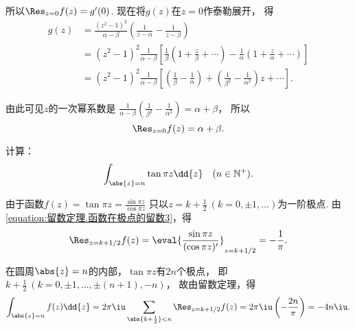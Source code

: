 \begin{example}
\begin{solution}
所以\(\Res_{z=0} f(z) = g'(0)\).
现在将\(g(z)\)在\(z=0\)作泰勒展开，
得\begin{align*}
	g(z) &= \frac{(z^2-1)^2}{\alpha-\beta}
		\left(\frac{1}{z-\alpha}-\frac{1}{z-\beta}\right) \\
	&= (z^2-1)^2 \frac{1}{\alpha-\beta}
		\left[
			\frac{1}{\beta} \left(1+\frac{z}{\beta}+\dotsb\right)
			- \frac{1}{\alpha} \left(1+\frac{z}{\alpha}+\dotsb\right)
		\right] \\
	&= (z^2-1)^2 \frac{1}{\alpha-\beta}
		\left[
			\left(\frac{1}{\beta}-\frac{1}{\alpha}\right)
			+ \left(\frac{1}{\beta^2}-\frac{1}{\alpha^2}\right) z
			+ \dotsb
		\right].
\end{align*}

由此可见\(z\)的一次幂系数是
\(\frac{1}{\alpha-\beta} \left(\frac{1}{\beta^2}-\frac{1}{\alpha^2}\right)
= \alpha+\beta\)，
所以\begin{equation*}
	\Res_{z=0} f(z) = \alpha+\beta.
\end{equation*}
\end{solution}
\end{example}

\begin{example}
计算：\begin{equation*}
	\int_{\abs{z}=n} \tan \pi z \dd{z}
	\quad(n\in\mathbb{N}^+).
\end{equation*}
\begin{solution}
由于函数\(f(z) = \tan \pi z = \frac{\sin \pi z}{\cos \pi z}\)
只以\(z=k+\frac{1}{2}\ (k=0,\pm1,\dotsc)\)为一阶极点.
由\cref{equation:留数定理.函数在极点的留数3}，得\begin{equation*}
	\Res_{z=k+1/2} f(z)
	= \eval{\frac{\sin \pi z}{(\cos \pi z)'}}_{z=k+1/2}
	= -\frac{1}{\pi}.
\end{equation*}

在圆周\(\abs{z}=n\)的内部，\(\tan \pi z\)有\(2n\)个极点，
即\(k + \frac{1}{2}\ (k=0,\pm1,\dotsc,\pm(n+1),-n)\)，
故由留数定理，得\begin{equation*}
	\int_{\abs{z}=n} f(z) \dd{z}
	= 2\pi\iu \sum_{\abs{k+\frac{1}{2}}<n} \Res_{z=k+1/2} f(z)
	= 2\pi\iu \left(-\frac{2n}{\pi}\right)
	= -4n\iu.
\end{equation*}
\end{solution}
\end{example}
